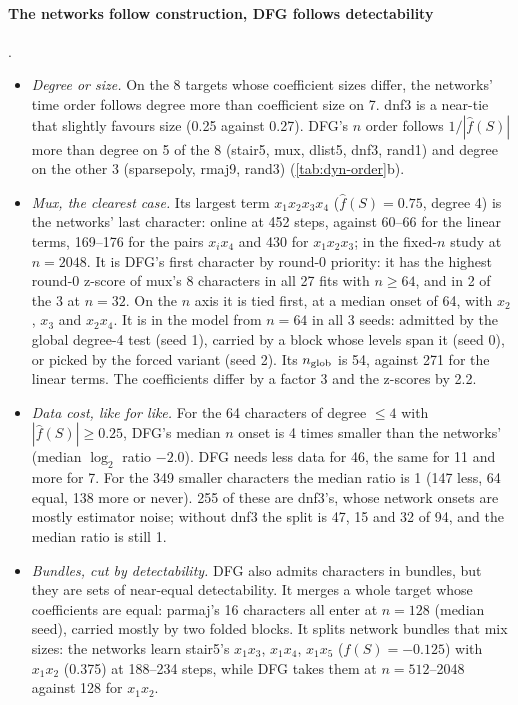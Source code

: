 \paragraph{The networks follow construction, DFG follows detectability} .
\begin{itemize}
\item \emph{Degree or size.} On the 8 targets whose coefficient sizes differ, the networks' time order follows degree more than coefficient size on 7. dnf3 is a near-tie that slightly favours size (0.25 against 0.27). DFG's $n$ order follows $1/|\hat f(S)|$ more than degree on 5 of the 8 (stair5, mux, dlist5, dnf3, rand1) and degree on the other 3 (sparsepoly, rmaj9, rand3) (\cref{tab:dyn-order}b).
\item \emph{Mux, the clearest case.} Its largest term $x_1x_2x_3x_4$ ($\hat f(S)=0.75$, degree 4) is the networks' last character: online at 452 steps, against 60--66 for the linear terms, 169--176 for the pairs $x_ix_4$ and 430 for $x_1x_2x_3$; in the fixed-$n$ study at $n=2048$. It is DFG's first character by round-0 priority: it has the highest round-0 z-score of mux's 8 characters in all 27 fits with $n\ge64$, and in 2 of the 3 at $n=32$. On the $n$ axis it is tied first, at a median onset of 64, with $x_2$, $x_3$ and $x_2x_4$. It is in the model from $n=64$ in all 3 seeds: admitted by the global degree-4 test (seed 1), carried by a block whose levels span it (seed 0), or picked by the forced variant (seed 2). Its $n_{\rm glob}$ is 54, against 271 for the linear terms. The coefficients differ by a factor 3 and the z-scores by 2.2.
\item \emph{Data cost, like for like.} For the 64 characters of degree $\le4$ with $|\hat f(S)|\ge0.25$, DFG's median $n$ onset is 4 times smaller than the networks' (median $\log_2$ ratio $-2.0$). DFG needs less data for 46, the same for 11 and more for 7. For the 349 smaller characters the median ratio is 1 (147 less, 64 equal, 138 more or never). 255 of these are dnf3's, whose network onsets are mostly estimator noise; without dnf3 the split is 47, 15 and 32 of 94, and the median ratio is still 1.
\item \emph{Bundles, cut by detectability.} DFG also admits characters in bundles, but they are sets of near-equal detectability. It merges a whole target whose coefficients are equal: parmaj's 16 characters all enter at $n=128$ (median seed), carried mostly by two folded blocks. It splits network bundles that mix sizes: the networks learn stair5's $x_1x_3$, $x_1x_4$, $x_1x_5$ ($\hat f(S)=-0.125$) with $x_1x_2$ (0.375) at 188--234 steps, while DFG takes them at $n=512$--2048 against 128 for $x_1x_2$.

\end{itemize}
